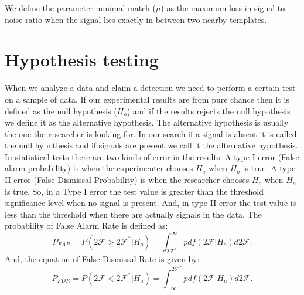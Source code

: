 \documentclass{ttuthes2007}
\begin{document}
We define the parameter minimal match ($\mu$) as the maximum loss in signal to
noise ratio when the signal lies exactly in between two nearby templates. 
\section{Hypothesis testing}                                                    
        When we analyze a data and claim a detection we need to perform a certain
test on a sample of data. If our experimental results are from pure chance then
it is defined as the null hypothesis ($H_o$) and if the results rejects the null
hypothesis we define it as the alternative hypothesis. The alternative
hypothesis is
usually the one the researcher is looking for.  In our search if a signal is absent it is
called the null hypothesis and if signals are present we call it the alternative
hypothesis.
	In statistical tests there are two kinds of error in the
results. A type I error (False alarm probability) is when the experimenter
chooses $H_a$ when $H_o$ is true. A type II error (False Dismissal
Probability) is when the researcher chooses $H_o$ when $H_a$ is true.  So, in
a Type I error the test value is greater than the threshold significance level
when no signal is present. And, in type II error the test value is less than
the threshold when there are actually signals in the data.
The probability of False Alarm Rate is defined as:
\begin{equation}
P_{FAR}=P(2\mathcal{F}>2\mathcal{F}^*|H_o)=\int_{2\mathcal{F}^*}^\infty
pdf(2\mathcal{F}|H_o)d2\mathcal{F}.
\end{equation}
And, the equation of False Dismissal Rate is given by:
\begin{equation}
P_{FDR}=P(2\mathcal{F}<2\mathcal{F}^*|H_a)=\int_{-\infty}^{2\mathcal{F}^*}
pdf(2\mathcal{F}|H_a)d2\mathcal{F}.
\end{equation}
\end{document}
